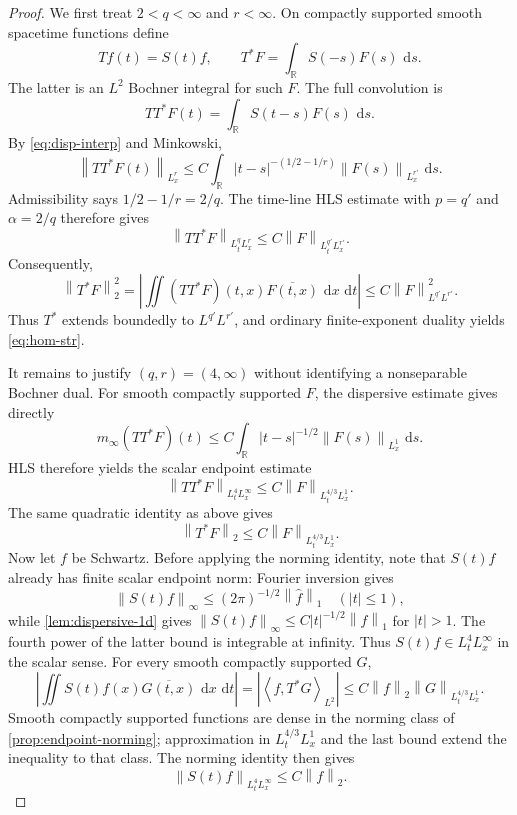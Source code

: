 \documentclass[11pt,oneside]{book}
\theoremstyle{definition}
\theoremstyle{remark}
\newcommand{\R}{\mathbb R}
\newcommand{\1}{\mathbf 1}
\newcommand{\dd}{\,\mathrm d}
\newcommand{\norm}[1]{\left\lVert #1\right\rVert}
\newcommand{\pair}[2]{\left\langle #1,#2\right\rangle}
\begin{document}
\begin{proof}
We first treat $2<q<\infty$ and $r<\infty$.  On compactly supported smooth
spacetime functions define
\[
 Tf(t)=S(t)f,
 \qquad
 T^*F=\int_\R S(-s)F(s)\,\dd s.
\]
The latter is an $L^2$ Bochner integral for such $F$.  The full convolution is
\[
 TT^*F(t)=\int_\R S(t-s)F(s)\,\dd s.
\]
By \eqref{eq:disp-interp} and Minkowski,
\[
 \norm{TT^*F(t)}_{L^r_x}
 \le C\int_\R|t-s|^{-(1/2-1/r)}
              \norm{F(s)}_{L^{r'}_x}\,\dd s.
\]
Admissibility says $1/2-1/r=2/q$.  The time-line HLS estimate with
$p=q'$ and $\alpha=2/q$ therefore gives
\begin{equation}
 \norm{TT^*F}_{L^q_tL^r_x}
 \le C\norm F_{L^{q'}_tL^{r'}_x}.                 \label{eq:TTstar-finite}
\end{equation}
Consequently,
\[
 \norm{T^*F}_2^2
 =\left|\iint (TT^*F)(t,x)\overline{F(t,x)}\,\dd x\,\dd t\right|
 \le C\norm F_{L^{q'}L^{r'}}^2.
\]
Thus $T^*$ extends boundedly to $L^{q'}L^{r'}$, and ordinary finite-exponent
duality yields \eqref{eq:hom-str}.

It remains to justify $(q,r)=(4,\infty)$ without identifying a nonseparable
Bochner dual.  For smooth compactly supported $F$, the dispersive estimate
gives directly
\[
 m_\infty(TT^*F)(t)
 \le C\int_\R|t-s|^{-1/2}\norm{F(s)}_{L^1_x}\,\dd s.
\]
HLS therefore yields the scalar endpoint estimate
\begin{equation}
 \norm{TT^*F}_{L^4_tL^\infty_x}
 \le C\norm F_{L^{4/3}_tL^1_x}.                  \label{eq:TTstar-endpoint}
\end{equation}
The same quadratic identity as above gives
\[
 \norm{T^*F}_2\le C\norm F_{L^{4/3}_tL^1_x}.
\]
Now let $f$ be Schwartz.  Before applying the norming identity, note that
$S(t)f$ already has finite scalar endpoint norm: Fourier inversion gives
\[
 \norm{S(t)f}_\infty\le(2\pi)^{-1/2}\norm{\widehat f}_1
 \quad(|t|\le1),
\]
while \cref{lem:dispersive-1d} gives
$\norm{S(t)f}_\infty\le C|t|^{-1/2}\norm f_1$ for $|t|>1$.
The fourth power of the latter bound is integrable at infinity.  Thus
$S(t)f\in L^4_tL^\infty_x$ in the scalar sense.  For every smooth compactly
supported $G$,
\[
 \left|\iint S(t)f(x)\overline{G(t,x)}\,\dd x\,\dd t\right|
 =|\pair f{T^*G}_{L^2}|
 \le C\norm f_2\norm G_{L^{4/3}_tL^1_x}.
\]
Smooth compactly supported functions are dense in the norming class of
\cref{prop:endpoint-norming}; approximation in $L^{4/3}_tL^1_x$ and the last
bound extend the inequality to that class.  The norming identity then gives
\[
 \norm{S(t)f}_{L^4_tL^\infty_x}\le C\norm f_2.
\]


\end{proof}
\end{document}
